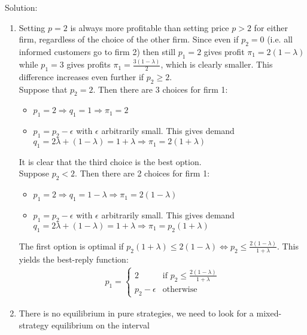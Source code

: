 \begin{enumerate}
	      Solution:
	      \begin{enumerate}
		      \item Setting $p=2$ is always more profitable than setting price $p>2$ for either firm, regardless of the choice
		            of the other firm. Since even if $p_2=0$ (i.e. all informed customers go to firm 2) then still $p_1=2$ gives
		            profit $\pi_1=2(1-\lambda)$ while $p_1=3$ gives profits $\pi_1=\frac{3(1-\lambda)}{2}$, which is clearly smaller.
		            This difference increases even further if $p_2\geq2$.\\
		            Suppose that $p_2=2$. Then there are 3 choices for firm 1:
		            \begin{itemize}
			            \item $p_1=2\Longrightarrow q_1=1\Longrightarrow \pi_1=2 $
			            \item $p_1=p_2-\epsilon$ with $\epsilon$ arbitrarily small. This gives demand
			                  $q_1=2\lambda+(1-\lambda)=1+\lambda\Longrightarrow\pi_1=2(1+\lambda ) $
		            \end{itemize}
		            It is clear that the third choice is the best option.\\
		            Suppose $p_2<2$. Then there are 2 choices for firm 1:
		            \begin{itemize}
			            \item $p_1=2\Longrightarrow q_1=1-\lambda\Longrightarrow\pi_1=2(1-\lambda)$
			            \item $p_1=p_2-\epsilon$ with $\epsilon$ arbitrarily small. This gives demand
			                  $q_1=2\lambda+(1-\lambda)=1+\lambda\Longrightarrow\pi_1=p_2(1+\lambda)$
		            \end{itemize}
		            The first option is optimal if
		            $p_2(1+\lambda)\leq2(1-\lambda)\Longleftrightarrow p_2\leq\frac{2(1-\lambda)}{1+\lambda} $. This yields the
		            best-reply function:
		            \begin{align*}
			            p_1=\begin{cases}
				                2            & \text{if }p_2\leq\frac{2(1-\lambda)}{1+\lambda} \\
				                p_2-\epsilon & \text{otherwise}
			                \end{cases}
		            \end{align*}
		      \item There is no equilibrium in pure strategies, we need to look for a mixed-strategy equilibrium on the interval

\end{enumerate}
\end{enumerate}
